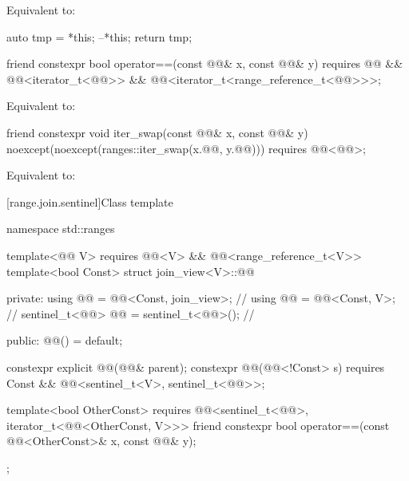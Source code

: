 \begin{itemdescr}
\pnum
\effects
Equivalent to:
\begin{codeblock}
auto tmp = *this;
--*this;
return tmp;
\end{codeblock}
\end{itemdescr}

%
\begin{itemdecl}
friend constexpr bool operator==(const @@& x, const @@& y)
  requires @@ && @@<iterator_t<@@>> &&
           @@<iterator_t<range_reference_t<@@>>>;
\end{itemdecl}

\begin{itemdescr}
\pnum
\effects
Equivalent to:
\end{itemdescr}

%
\begin{itemdecl}
friend constexpr void iter_swap(const @@& x, const @@& y)
  noexcept(noexcept(ranges::iter_swap(x.@@, y.@@)))
  requires @@<@@>;
\end{itemdecl}

\begin{itemdescr}
\pnum
\effects
Equivalent to: 
\end{itemdescr}

[range.join.sentinel]{Class template }

%
\begin{codeblock}
namespace std::ranges {
  template<@@ V>
    requires @@<V> && @@<range_reference_t<V>>
  template<bool Const>
  struct join_view<V>::@@ {
  private:
    using @@ = @@<Const, join_view>;       // \expos
    using @@ = @@<Const, V>;                 // \expos
    sentinel_t<@@> @@ = sentinel_t<@@>();         // \expos

  public:
    @@() = default;

    constexpr explicit @@(@@& parent);
    constexpr @@(@@<!Const> s)
      requires Const && @@<sentinel_t<V>, sentinel_t<@@>>;

    template<bool OtherConst>
      requires @@<sentinel_t<@@>, iterator_t<@@<OtherConst, V>>>
    friend constexpr bool operator==(const @@<OtherConst>& x, const @@& y);
  };
}
\end{codeblock}

